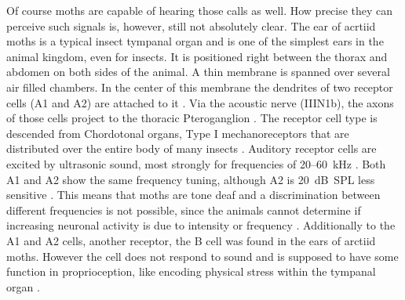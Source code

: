 \documentclass[12pt,a4paper,pdftex]{article}
\begin{document}
Of course moths are capable of hearing those calls as well. How precise they can perceive such signals is, however, still not absolutely clear. The ear of acrtiid moths is a typical insect tympanal organ and is one of the simplest ears in the animal kingdom, even for insects. It is positioned right between the thorax and abdomen on both sides of the animal. A thin membrane is spanned over several air filled chambers. In the center of this membrane the dendrites of two receptor cells (A1 and A2) are attached to it \cite{yager1999}. Via the acoustic nerve (IIIN1b), the axons of those cells project to the thoracic Pteroganglion \cite{paul1973}. The receptor cell type is descended from Chordotonal organs, Type I mechanoreceptors that are distributed over the entire body of many insects \cite{miller2001, yack2004}. Auditory receptor cells are excited by ultrasonic sound, most strongly for frequencies of 20--60~kHz \cite{fullard1988, yager1999, terhofstede2013, nakano2014}. Both A1 and A2 show the same frequency tuning, although A2 is 20~dB~SPL less sensitive \cite{miller2001}. This means that moths are tone deaf and a discrimination between different frequencies is not possible, since the animals cannot determine if increasing neuronal activity is due to intensity or frequency \cite{roeder1966, terhofstede2013}. Additionally to the A1 and A2 cells, another receptor, the B cell was found in the ears of arctiid moths. However the cell does not respond to sound \cite{fullard2003} and is supposed to have some function in proprioception, like encoding physical stress within the tympanal organ \cite{waters2003}. 
\end{document}
